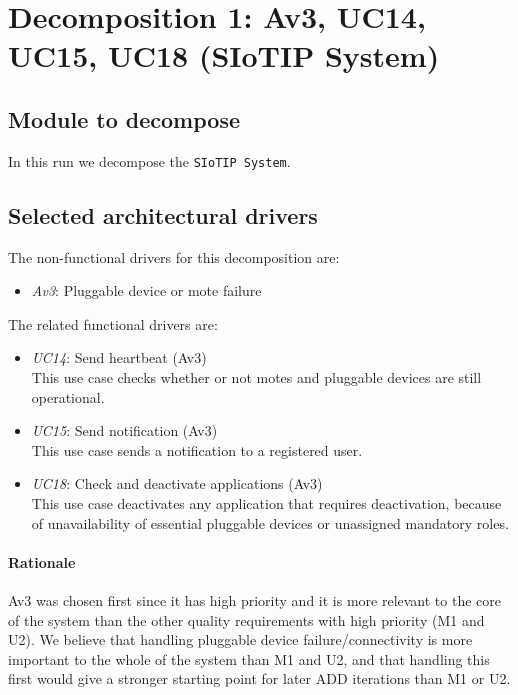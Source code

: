 \section{Decomposition 1: Av3, UC14, UC15, UC18 (SIoTIP System)}

\subsection{Module to decompose}
    In this run we decompose the \texttt{SIoTIP System}.


\subsection{Selected architectural drivers}
    The non-functional drivers for this decomposition are:
    \begin{itemize}
    	\item \emph{Av3}: Pluggable device or mote failure
    \end{itemize}

    The related functional drivers are:
    \begin{itemize}
    	\item \emph{UC14}: Send heartbeat (Av3) \\
              This use case checks whether or not motes and pluggable devices
              are still operational.
    	\item \emph{UC15}: Send notification (Av3) \\
              This use case sends a notification to a registered user.
    	\item \emph{UC18}: Check and deactivate applications (Av3) \\
              This use case deactivates any application that requires deactivation,
              because of unavailability of essential pluggable devices
              or unassigned mandatory roles.
    \end{itemize}

    \paragraph{Rationale}
        Av3 was chosen first since it has high priority and it is more relevant to
        the core of the system than the other quality requirements with high
        priority (M1 and U2).
        We believe that handling pluggable device failure/connectivity is
        more important to the whole of the system than M1 and U2, and that
        handling this first would give a stronger starting point for later ADD iterations
        than M1 or U2.



